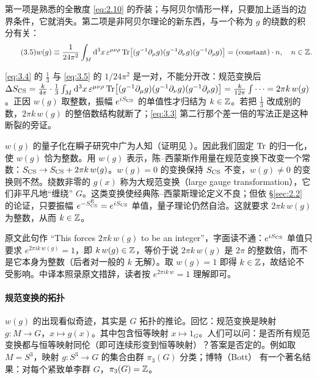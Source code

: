 第一项是熟悉的全散度 \eqref{eq:2.10} 的乔装；与阿贝尔情形一样，只要加上适当的边界条件，它就消失。第二项是非阿贝尔理论的新东西，与一个称为 $g$ 的绕数的积分有关：
\begin{equation}\tag{3.5}\label{eq:3.5}
  w(g) \equiv \frac{1}{24\pi^2}\int_M \mathrm{d}^3x\,\varepsilon^{\mu\nu\rho}\operatorname{Tr}\bigl[(g^{-1}\partial_\mu g)(g^{-1}\partial_\nu g)(g^{-1}\partial_\rho g)\bigr] = (\text{constant})\cdot n,
  \quad n\in\mathbb{Z}.
\end{equation}

\begin{yizhu}[易错点]
\eqref{eq:3.4} 的 $\frac13$ 与 \eqref{eq:3.5} 的 $1/24\pi^2$ 是一对，不能分开改：规范变换后 $\Delta S_{\mathrm{CS}}=\frac{k}{4\pi}\cdot\frac13\int_M\mathrm{d}^3x\,\varepsilon^{\mu\nu\rho}\operatorname{Tr}\bigl[(g^{-1}\partial_\mu g)(g^{-1}\partial_\nu g)(g^{-1}\partial_\rho g)\bigr]=\frac{k}{12\pi}\int\cdots=2\pi k\,w(g)$。正因 $w(g)$ 取整数，振幅 $e^{iS_{\mathrm{CS}}}$ 的单值性才归结为 $k\in\mathbb{Z}$。若把 $\frac13$ 改成别的数，$2\pi k\,w(g)$ 的整倍数结构就断了；\eqref{eq:3.3} 第二行那个差一倍的写法正是这种断裂的旁证。
\end{yizhu}

$w(g)$ 的量子化在瞬子研究中广为人知（证明见 \cite{coleman}）。因此我们固定 $\operatorname{Tr}$ 的归一化，使 $w(g)$ 恰为整数。用 $w(g)$ 表示，陈--西蒙斯作用量在规范变换下改变一个常数：$S_{\mathrm{CS}}\to S_{\mathrm{CS}}+2\pi k\,w(g)$。$w(g)=0$ 的变换保持 $S_{\mathrm{CS}}$ 不变，$w(g)\neq0$ 的变换则不然。绕数非零的 $g(x)$ 称为大规范变换（large gauge transformation），它们非平凡地“缠绕” $G$。这类变换使经典陈--西蒙斯理论定义不良；但依 \S\ref{sec:2.2} 的论证，只要振幅 $e^{-S^{\mathrm{E}}_{\mathrm{CS}}}=e^{iS_{\mathrm{CS}}}$ 单值，量子理论仍然自洽。这就要求 $2\pi k\,w(g)$ 为整数，从而 $k\in\mathbb{Z}$。

\begin{yizhu}[原文疑误]
原文此句作 “This forces $2\pi k\,w(g)$ to be an integer”，字面读不通：$e^{iS_{\mathrm{CS}}}$ 单值只要求 $e^{2\pi ik\,w(g)}=1$，即 $k\,w(g)\in\mathbb{Z}$，等价于说 $2\pi k\,w(g)$ 是 $2\pi$ 的整数倍，而不是它本身为整数（后者对一般的 $k$ 无解）。取 $w(g)=1$ 即得 $k\in\mathbb{Z}$，故结论不受影响。中译本照录原文措辞，读者按 $e^{2\pi ik\,w}=1$ 理解即可。
\end{yizhu}

\paragraph{规范变换的拓扑}
$w(g)$ 的出现看似奇迹，其实是 $G$ 拓扑的推论。回忆：规范变换是映射 $g\colon M\to G$，$x\mapsto g(x)$。其中包含恒等映射 $x\mapsto 1_G$。人们可以问：是否所有规范变换都与恒等映射同伦（即可连续形变到恒等映射）？答案是否定的。例如取 $M=S^3$，映射 $g\colon S^3\to G$ 的集合由群 $\pi_3(G)$ 分类；博特（Bott）\cite{bott1956} 有一个著名结果：对每个紧致单李群 $G$，$\pi_3(G)=\mathbb{Z}$。

